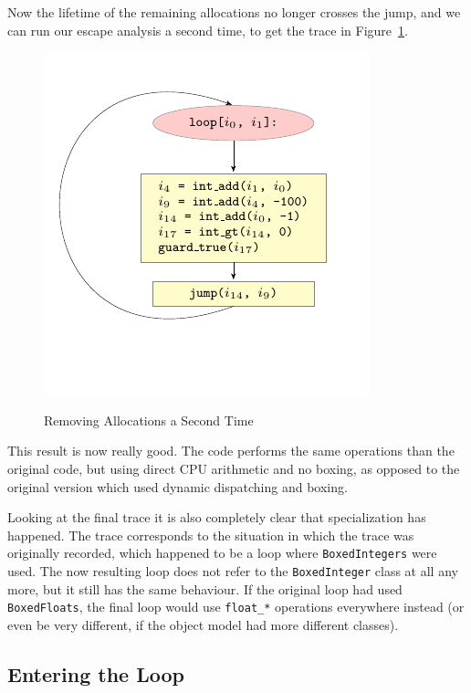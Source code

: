 \documentclass{sigplanconf}
\begin{document}
Now the lifetime of the remaining allocations no longer crosses the jump, and
we can run our escape analysis a second time, to get the trace in
Figure~\ref{fig:step3}.

\begin{figure}
\includegraphics{figures/step3.pdf}
\label{fig:step3}
\caption{Removing Allocations a Second Time}
\end{figure}

This result is now really good. The code performs the same operations than
the original code, but using direct CPU arithmetic and no boxing, as opposed to
the original version which used dynamic dispatching and boxing.

Looking at the final trace it is also completely clear that specialization has
happened. The trace corresponds to the situation in which the trace was
originally recorded, which happened to be a loop where \texttt{BoxedIntegers} were
used. The now resulting loop does not refer to the \texttt{BoxedInteger} class at
all any more, but it still has the same behaviour. If the original loop had
used \texttt{BoxedFloats}, the final loop would use \texttt{float\_*} operations
everywhere instead (or even be very different, if the object model had
more different classes).



\subsection{Entering the Loop}
\end{document}
